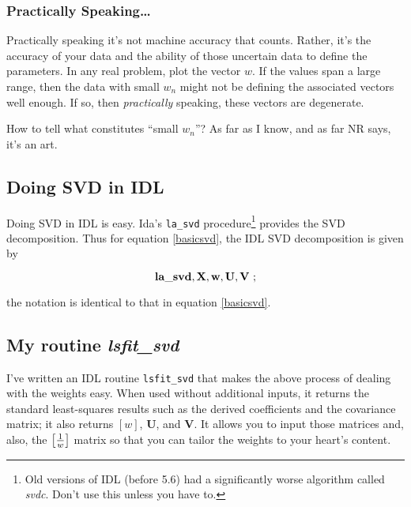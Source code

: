 \documentclass[psfig,preprint]{aastex}
\begin{document}
\subsubsection{Practically Speaking\dots}

	Practically speaking it's not machine accuracy that counts.
Rather, it's the accuracy of your data and the ability of those
uncertain data to define the parameters. In any real problem, plot the
vector $w$. If the values span a large range, then the data with small
$w_n$ might not be  defining the associated vectors well enough. If so, 
then {\it practically} speaking, these vectors are degenerate. 

	How to tell what constitutes ``small $w_n$''? As far as I know,
and as far NR says, it's an art.

\subsection {Doing SVD in IDL} \label{svdandidl}

	Doing SVD in IDL is easy.  Ida's \verb$la_svd$
procedure\footnote{Old versions of IDL (before 5.6) had a significantly
worse algorithm called {\it svdc}.  Don't use this unless you have to.}
provides the SVD decomposition.  Thus for equation \ref {basicsvd}, the
IDL SVD decomposition is given by

\begin{equation}
{\bf la\_svd, X, w, U, V} \ ;
\end{equation}

\noindent the notation is identical to that in equation \ref {basicsvd}. 

\subsection{My routine {\it lsfit\_svd}} \label{myidl}

	I've written an IDL routine \verb$lsfit_svd$ that makes the
above process of dealing with the weights easy.  When used without
additional inputs, it returns the standard least-squares results such
as the derived coefficients and the covariance matrix; it also returns
$[w]$, $\mathbf {U}$, and $\mathbf {V}$. It allows you to input those
matrices and, also, the $\left[ 1 \over w \right]$ matrix so that you
can tailor the weights to your heart's content. 
\end{document}
